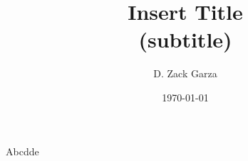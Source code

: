 \documentclass[11pt]{article}
\title{
	\textbf{Insert Title}\\ 
	{\normalsize (subtitle)}
}
\author{D. Zack Garza}
\date{\today}
\begin{document}
\maketitle


Abcdde\cite{	hatcherAlgebraicTopologya}


 

\end{document}
